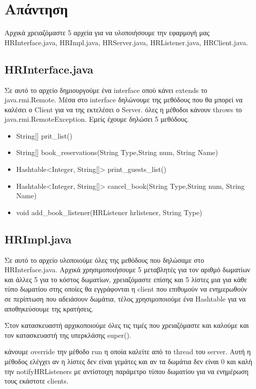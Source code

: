 %
%
\setcounter{section}{0}
\section{Απάντηση}

\noindent
Αρχικά χρειαζόμαστε 5 αρχεία για να υλοποιήσουμε την εφαρμογή μας
HRInterface.java, HRImpl.java, HRServer.java, HRListener.java, HRClient.java.
\subsection{HRInterface.java}
\noindent 
Σε αυτό το αρχείο δημιουργούμε ένα interface οπού κάνει extends το java.rmi.Remote. Μέσα στο interface δηλώνουμε της μεθόδους που θα μπορεί
 να καλέσει ο Client για να της εκτελέσει ο Server. όλες η μέθοδοι κάνουν
  throws το java.rmi.RemoteException. Εμείς έχουμε δηλώσει 5 μεθόδους.
\begin{itemize}
	\item String[] prit\_list()
	\item String[] book\_reservations(String Type,String num, String Name)
	\item Hashtable<Integer, String[]> print\_guests\_list()
	\item Hashtable<Integer, String[]> cancel\_book(String Type,String num, String Name)
	\item void add\_book\_listener(HRListener hrlistener, String Type)
\end{itemize}

\subsection{HRImpl.java}
\noindent 
Σε αυτό το αρχείο υλοποιούμε όλες της μεθόδους που δηλώσαμε στο HRInterface.java. Αρχικά χρησιμοποιήσουμε 5 μεταβλητές για τον αριθμό δωματίων και άλλες 5 για το κόστος δωματίων, χρειαζόμαστε επίσης και 5 λίστες
μια για κάθε τύπο δωματίου στης οποίες θα εγγράφονται η client που επιθυμούν
να ενημερωθούν σε περίπτωση που αδειάσουν δωμάτια, τέλος χρησιμοποιούμε ένα
Hashtable για να αποθηκεύσουμε της κρατήσεις. 

\noindent
Στον κατασκευαστή αρχικοποιούμε όλες τις τιμές που χρειαζόμαστε και καλούμε
και τον κατασκευαστή της υπερκλάσης super().

\noindent
κάνουμε override την μέθοδο run η οποία καλείτε από το thread του server.
Aυτή η μέθοδος ελέγχει αν η λίστες δεν είναι γεμάτες και αν τα δωμάτια δεν
είναι 0 και καλή την notifyHRListeners με αντίστοιχη παράμετρο τύπου δωματίου
για να ενημέρωση τους εκάστοτε clients.

